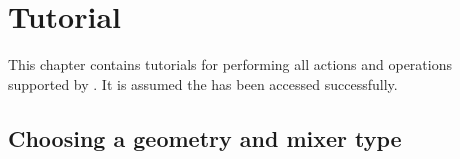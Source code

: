 \chapter{Tutorial}
This chapter contains tutorials for performing all actions and operations supported by \projectname. It is assumed the \applicationname has been accessed successfully. 

%
%
%
%
%
%

\section{Choosing a geometry and mixer type}
\label{sec:ChooseGeomAndMixer}

